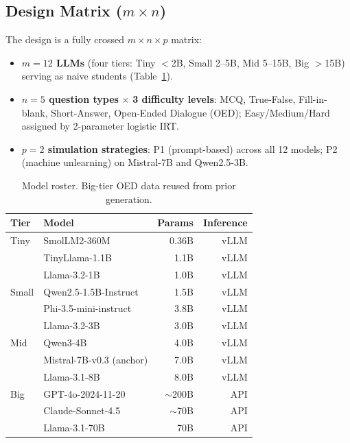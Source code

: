 \documentclass[10pt,twocolumn]{IEEEtran}
\begin{document}
\subsection{Design Matrix (\texorpdfstring{$m \times n$}{m×n})}

The design is a fully crossed \(m \times n \times p\) matrix:

\begin{itemize}
\item \textbf{$m = 12$ LLMs} (four tiers: Tiny $<$2B, Small 2--5B, Mid 5--15B,
  Big $>$15B) serving as naive students (Table~\ref{tab:models}).
\item \textbf{$n = 5$ question types} $\times$ \textbf{3 difficulty levels}:
  MCQ, True-False, Fill-in-blank, Short-Answer, Open-Ended Dialogue (OED);
  Easy/Medium/Hard assigned by 2-parameter logistic IRT.
\item \textbf{$p = 2$ simulation strategies}: P1 (prompt-based) across all 12
  models; P2 (machine unlearning) on Mistral-7B and Qwen2.5-3B.
\end{itemize}

\begin{table}[t]
\centering
\caption{Model roster. Big-tier OED data reused from prior generation.}
\label{tab:models}
\begin{tabular}{llrr}
\toprule
Tier & Model & Params & Inference \\
\midrule
Tiny  & SmolLM2-360M         & 0.36B & vLLM \\
      & TinyLlama-1.1B       & 1.1B  & vLLM \\
      & Llama-3.2-1B         & 1.0B  & vLLM \\
\midrule
Small & Qwen2.5-1.5B-Instruct & 1.5B & vLLM \\
      & Phi-3.5-mini-instruct & 3.8B  & vLLM \\
      & Llama-3.2-3B          & 3.0B  & vLLM \\
\midrule
Mid   & Qwen3-4B              & 4.0B  & vLLM \\
      & Mistral-7B-v0.3 (anchor) & 7.0B & vLLM \\
      & Llama-3.1-8B          & 8.0B  & vLLM \\
\midrule
Big   & GPT-4o-2024-11-20    & $\sim$200B & API \\
      & Claude-Sonnet-4.5    & $\sim$70B  & API \\
      & Llama-3.1-70B        & 70B   & API \\
\bottomrule
\end{tabular}
\end{table}
\end{document}

